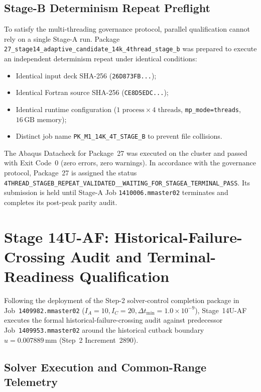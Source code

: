 \subsection{Stage-B Determinism Repeat Preflight}
\label{subsec:stage14uae_stage_b_preflight}

To satisfy the multi-threading governance protocol, parallel qualification cannot rely on a single Stage-A run. Package \texttt{27\_stage14\_adaptive\_candidate\_14k\_4thread\_stage\_b} was prepared to execute an independent determinism repeat under identical conditions:
\begin{itemize}
  \item Identical input deck SHA-256 (\texttt{26D873FB...});
  \item Identical Fortran source SHA-256 (\texttt{CE8D5EDC...});
  \item Identical runtime configuration ($1\text{ process} \times 4\text{ threads}$, \texttt{mp\_mode=threads}, $16\,\text{GB}$ memory);
  \item Distinct job name \texttt{PK\_M1\_14K\_4T\_STAGE\_B} to prevent file collisions.
\end{itemize}
The Abaqus Datacheck for Package~27 was executed on the cluster and passed with Exit Code~0 (zero errors, zero warnings). In accordance with the governance protocol, Package~27 is assigned the status \texttt{4THREAD\_STAGEB\_REPEAT\_VALIDATED\_\_WAITING\_FOR\_STAGEA\_TERMINAL\_PASS}. Its submission is held until Stage-A Job \texttt{1410006.mmaster02} terminates and completes its post-peak parity audit.

\section{Stage 14U-AF: Historical-Failure-Crossing Audit and Terminal-Readiness Qualification}
\label{sec:stage14uaf_failure_crossing_audit}

Following the deployment of the Step-2 solver-control completion package in Job~\texttt{1409982.mmaster02} ($I_A=10, I_C=20, \Delta t_{\min}=1.0\times 10^{-9}$), Stage~14U-AF executes the formal historical-failure-crossing audit against predecessor Job~\texttt{1409953.mmaster02} around the historical cutback boundary $u = 0.007889\,\mathrm{mm}$ (Step~2 Increment~2890).

\subsection{Solver Execution and Common-Range Telemetry}
\label{subsec:stage14uaf_telemetry}

